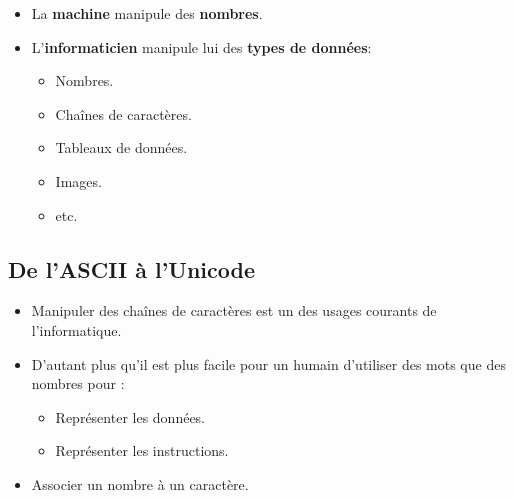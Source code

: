 \begin{slide}
  \begin{itemize}
    \item La \textbf{machine} manipule des \textbf{nombres}.
    \item L'\textbf{informaticien} manipule lui des \textbf{types de données}:
      \begin{itemize}
	\item Nombres.
	\item Chaînes de caractères.
	\item Tableaux de données.
	\item Images.
	\item etc. 
      \end{itemize}
  \end{itemize}
\end{slide}

\subsection{De l'ASCII à l'Unicode}
\begin{slide}
	\begin{itemize}
		\item Manipuler des chaînes de caractères est un des usages courants de l'informatique.
		\item D'autant plus qu'il est plus facile pour un humain d'utiliser des mots que des nombres pour :
			\begin{itemize}
				\item Représenter les données.
				\item Représenter les instructions.
			\end{itemize}
		\item Associer un nombre à un caractère.
	\end{itemize}
\end{slide}

